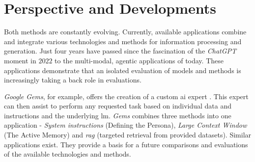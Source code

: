 \section{Perspective and Developments}

Both methods are constantly evolving.
Currently, available applications combine and integrate various technologies and methods for information processing and generation.
Just four years have passed since the fascination of the \textit{ChatGPT} moment in $2022$ to the multi-modal, agentic applications of today.
These applications demonstrate that an isolated evaluation of models and methods is increasingly taking a back role in evaluations.

\textit{Google Gems}, for example, offers the creation of a custom \ac{ai} expert \citet{Google2025Gemsoverview}.
This expert can then assist to perform any requested task based on individual data and instructions and the underlying \ac{lm}.
\textit{Gems} combines three methods into one application - \textit{System instructions} (Defining the Persona), \textit{Large Context Window} (The Active Memory) and \textit{\ac{rag}} (targeted retrieval from provided datasets).
Similar applications exist.
They provide a basis for a future comparisons and evaluations of the available technologies and methods.

